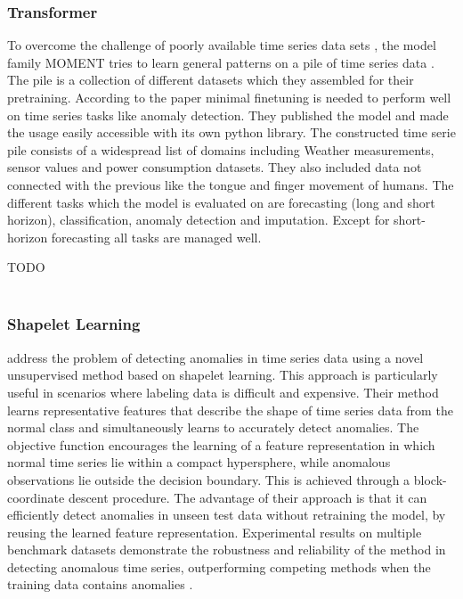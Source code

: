 \subsubsection{Transformer}
To overcome the challenge of poorly available time series data sets \cite{ma_survey_2023}, the model family MOMENT tries to learn general patterns on a pile of time series data \cite{goswami_moment_2024}. The pile is a collection of different datasets which they assembled for their pretraining. According to the paper minimal finetuning is needed to perform well on time series tasks like anomaly detection. They published the model and made the usage easily accessible with its own python library. The constructed time serie pile consists of a widespread list of domains including Weather measurements, sensor values and power consumption datasets. They also included data not connected with the previous like the tongue and finger movement of humans. The different tasks which the model is evaluated on are forecasting (long and short horizon), classification, anomaly detection and imputation. Except for short-horizon forecasting all tasks are managed well.


TODO \cite{li_anomaly_2024} \\\\ %
\subsubsection{Shapelet Learning}
 address the problem of detecting anomalies in time series data using a novel unsupervised method based on shapelet learning. This approach is particularly useful in scenarios where labeling data is difficult and expensive.
Their method learns representative features that describe the shape of time series data from the normal class and simultaneously learns to accurately detect anomalies. The objective function encourages the learning of a feature representation in which normal time series lie within a compact hypersphere, while anomalous observations lie outside the decision boundary. This is achieved through a block-coordinate descent procedure.
The advantage of their approach is that it can efficiently detect anomalies in unseen test data without retraining the model, by reusing the learned feature representation. Experimental results on multiple benchmark datasets demonstrate the robustness and reliability of the method in detecting anomalous time series, outperforming competing methods when the training data contains anomalies \cite{beggel_time_2019}.

